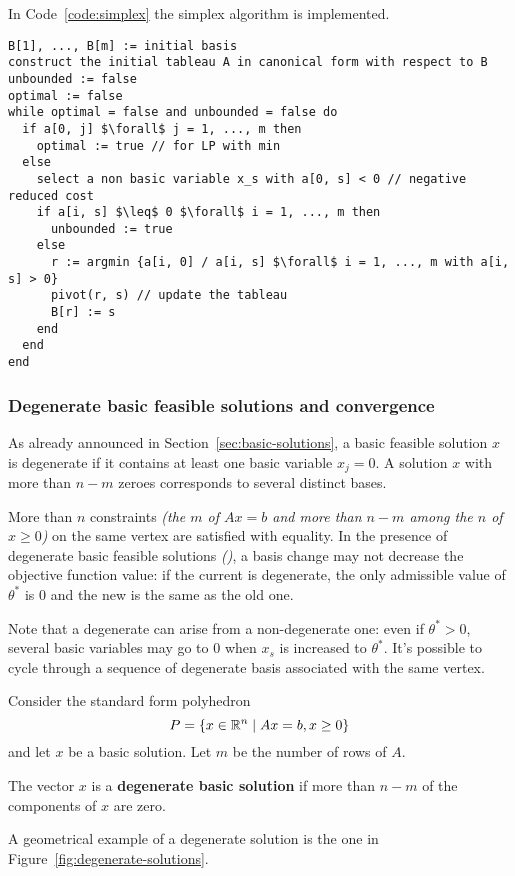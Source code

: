 \documentclass[english]{article}
\begin{document}
In Code~\ref{code:simplex} the simplex algorithm is implemented.

\begin{minipage}{0.99\textwidth}
  \begin{lstlisting}[caption={The simplex algorithm}, label={code:simplex}]
B[1], ..., B[m] := initial basis
construct the initial tableau A in canonical form with respect to B
unbounded := false
optimal := false
while optimal = false and unbounded = false do
  if a[0, j] $\forall$ j = 1, ..., m then
    optimal := true // for LP with min
  else
    select a non basic variable x_s with a[0, s] < 0 // negative reduced cost
    if a[i, s] $\leq$ 0 $\forall$ i = 1, ..., m then
      unbounded := true
    else
      r := argmin {a[i, 0] / a[i, s] $\forall$ i = 1, ..., m with a[i, s] > 0}
      pivot(r, s) // update the tableau
      B[r] := s
    end
  end
end
\end{lstlisting}
\end{minipage}

\subsubsection{Degenerate basic feasible solutions and convergence}

As already announced in Section~\ref{sec:basic-solutions}, a basic feasible solution \(x\) is degenerate if it contains at least one basic variable \(x_j = 0\).
A solution \(x\) with more than \(n -m\) zeroes corresponds to several distinct bases.

More than \(n\) constraints \textit{(the \(m\) of \(Ax = b\) and more than \(n-m\) among the \(n\) of \(x \geq 0\))} on the same vertex are satisfied with equality.
In the presence of degenerate basic feasible solutions \textit{(\BFS)}, a basis change may not decrease the objective function value:
if the current \BFS is degenerate, the only admissible value of \(\theta^\ast\) is \(0\) and the new \BFS is the same as the old one.

Note that a degenerate \BFS can arise from a non-degenerate one:
even if \(\theta^\ast > 0\), several basic variables may go to \(0\) when \(x_s\) is increased to \(\theta^\ast\).
It's possible to cycle through a sequence of degenerate basis associated with the same vertex.

\begin{definition}
  Consider the standard form polyhedron
  \[P = \left\{ x \in \mathbb{R}^n \mid   Ax = b, x \geq 0 \right\}\]
  and let \(x\) be a basic solution.
  Let \(m\) be the number of rows of \(A\).

  The vector \(x\) is a \textbf{degenerate basic solution} if more than \(n-m\) of the components of \(x\) are zero.
\end{definition}
\bigskip
A geometrical example of a degenerate solution is the one in Figure~\ref{fig:degenerate-solutions}.
\end{document}
